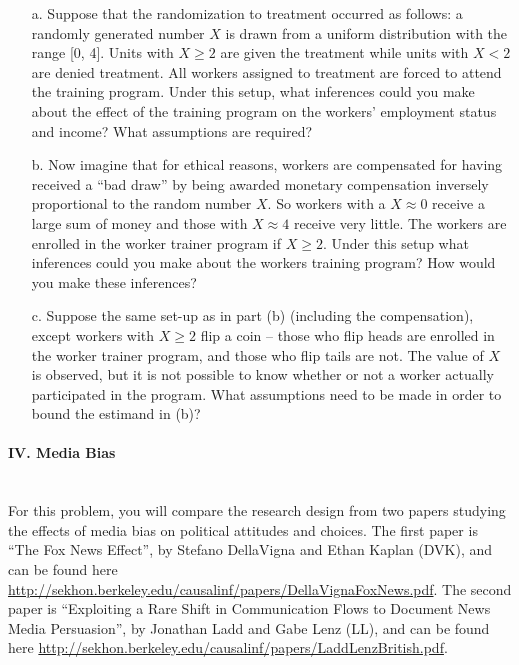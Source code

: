 \documentclass{article}
\begin{document}
\begin{itemize}
\item[a.] Suppose that the randomization to treatment occurred as
  follows: a randomly generated number $X$ is drawn from a uniform
  distribution with the range [0, 4]. Units with $X \geq 2$ are given
  the treatment while units with $X < 2$ are denied treatment. All
  workers assigned to treatment are forced to attend the training
  program. Under this setup, what inferences could you make about the
  effect of the training program on the workers' employment status and
  income? What assumptions are required?
\item[b.] Now imagine that for ethical reasons, workers are
  compensated for having received a ``bad draw'' by being awarded
  monetary compensation inversely proportional to the random number
  $X$. So workers with a $X \approx 0$ receive a large sum of money
  and those with $X \approx 4$ receive very little. The workers are
  enrolled in the worker trainer program if $X \geq 2$. Under this
  setup what inferences could you make about the workers training
  program? How would you make these inferences?

\item[c.] Suppose the same set-up as in part (b) (including the
  compensation), except workers with $X\geq2$ flip a coin -- those who
  flip heads are enrolled in the worker trainer program, and those who
  flip tails are not.  The value of $X$ is observed, but it is not
  possible to know whether or not a worker actually participated in
  the program.  What assumptions need to be made in order to bound the
  estimand in (b)?
\end{itemize}

\paragraph{\Large IV. Media Bias \\ \\}

For this problem, you will compare the research design from two papers
studying the effects of media bias on political attitudes and choices.
The first paper is ``The Fox News Effect'', by
Stefano DellaVigna and Ethan Kaplan (DVK), and can be found here
\url{http://sekhon.berkeley.edu/causalinf/papers/DellaVignaFoxNews.pdf}. The
second paper is ``Exploiting a Rare Shift in Communication Flows to
Document News Media Persuasion'', by Jonathan Ladd and Gabe Lenz (LL), and
can be found here \url{http://sekhon.berkeley.edu/causalinf/papers/LaddLenzBritish.pdf}.
\vspace{1em}
\end{document}
